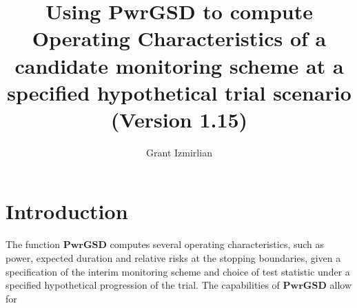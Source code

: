\documentclass{article}
\begin{document}
\title{Using PwrGSD to compute Operating Characteristics of a candidate monitoring scheme at
  a specified hypothetical trial scenario (Version 1.15)}
\author{Grant Izmirlian}
\maketitle

\section{Introduction}
The function $\mathbf{PwrGSD}$ computes several operating characteristics, such as
power, expected duration and relative risks at the stopping boundaries, given
a specification of the interim monitoring scheme and choice of test statistic
under a specified hypothetical progression of the trial. The capabilities of 
$\mathbf{PwrGSD}$ allow for 
\end{document}
